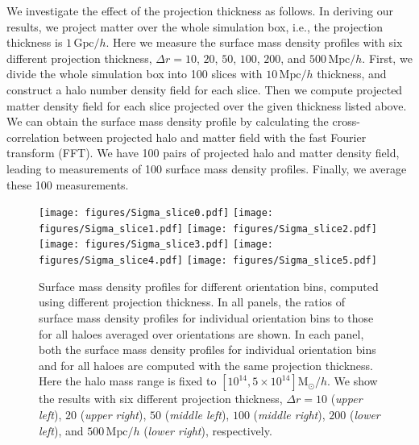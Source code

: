 \documentclass[a4paper,fleqn,usenatbib]{mnras}
\newcommand{\Mpc}{\mathrm{Mpc}}
\newcommand{\Msun}{\mathrm{M}_\odot}
\begin{document}
We investigate the effect of the projection thickness as follows.
In deriving our results, we project matter over the whole simulation
box, i.e., the projection thickness is $1\,\mathrm{Gpc}/h$.
Here we measure the surface mass density profiles with six different
projection thickness, $\Delta r = 10$, $20$, $50$, $100$, $200$, and
$500\,\Mpc/h$.
First, we divide the whole simulation box into 100
slices with $10\,\Mpc /h$ thickness, and construct a halo number
density field for each slice. Then we compute projected matter density
field for each slice projected over the given thickness listed above.
We can obtain the surface mass density profile by calculating
the cross-correlation between projected halo and matter field with
the fast Fourier transform (FFT). We have 100 pairs of projected halo
and matter density field, leading to measurements of 100 surface mass
density profiles. Finally, we average these 100 measurements.

\begin{figure*}
\texttt{[image: figures/Sigma\_slice0.pdf]}
\texttt{[image: figures/Sigma\_slice1.pdf]}
\texttt{[image: figures/Sigma\_slice2.pdf]}
\texttt{[image: figures/Sigma\_slice3.pdf]}
\texttt{[image: figures/Sigma\_slice4.pdf]}
\texttt{[image: figures/Sigma\_slice5.pdf]}
\caption{Surface mass density profiles for different orientation bins,
  computed using different projection thickness.
  In all panels, the ratios of
  surface mass density profiles for individual orientation bins to
  those for all haloes averaged over orientations are shown.
  In each panel, both the surface mass density profiles for
  individual orientation bins and for all haloes are computed
  with the same projection thickness.
  Here the halo mass range is fixed to $[10^{14}, 5 \times 10^{14}] \Msun /h$.
  We show the results with six different projection thickness,
  $\Delta r = 10$ ({\it upper left}), $20$ ({\it upper right}),
  $50$ ({\it middle left}), $100$ ({\it middle right}),
  $200$ ({\it lower left}), and $500\,\Mpc/h$ ({\it lower right}),
  respectively.}
\label{fig:Sigma_slice}
\end{figure*}
\end{document}
